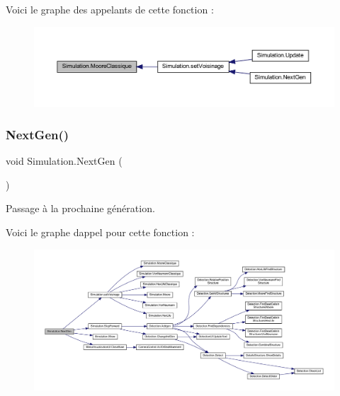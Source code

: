 Voici le graphe des appelants de cette fonction \+:\nopagebreak
\begin{figure}[H]
\begin{center}
\leavevmode
\includegraphics[width=350pt]{class_simulation_a39f92768aa24cee944387315749314ad_icgraph}
\end{center}
\end{figure}
\mbox{\label{class_simulation_a6027638c71846ed03d560cd75d8a92d6}} 
\subsubsection{\texorpdfstring{Next\+Gen()}{NextGen()}}
{\footnotesize\ttfamily void Simulation.\+Next\+Gen (\begin{DoxyParamCaption}{ }\end{DoxyParamCaption})\hspace{0.3cm}{\ttfamily [inline]}}



Passage à la prochaine génération. 

Voici le graphe d\textquotesingle{}appel pour cette fonction \+:
\nopagebreak
\begin{figure}[H]
\begin{center}
\leavevmode
\includegraphics[width=350pt]{class_simulation_a6027638c71846ed03d560cd75d8a92d6_cgraph}
\end{center}
\end{figure}
\mbox{\label{class_simulation_ab668bfea667549d1295fc55f5ccfbc4a}} 
